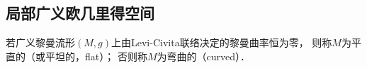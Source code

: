







\subsection{局部广义欧几里得空间}\label{chrg:sec_local-EuclideanSpace}


\begin{definition}\label{chrg:def_flat-curved}
    若广义黎曼流形$(M,g)$上由Levi-Civita联络决定的黎曼曲率恒为零，
    则称$M$为{\heiti 平直的}（或平坦的，flat）；  否则称$M$为{\heiti 弯曲的}（curved）．
\end{definition}

